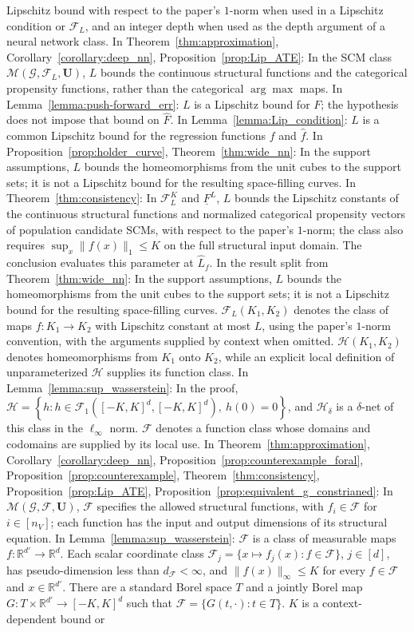 \documentclass[12pt]{article}
\theoremstyle{plain}
\theoremstyle{definition}
\theoremstyle{remark}
\begin{document}
Lipschitz bound with respect to the paper's $1$-norm when used in a Lipschitz condition or $\mathcal{F}_L$, and an integer depth when used as the depth argument of a neural network class. In Theorem~\ref{thm:approximation}, Corollary~\ref{corollary:deep_nn}, Proposition~\ref{prop:Lip_ATE}: In the SCM class $\mathcal{M}(\mathcal{G},\mathcal{F}_L,\boldsymbol{U})$, $L$ bounds the continuous structural functions and the categorical propensity functions, rather than the categorical $\arg\max$ maps. In Lemma~\ref{lemma:push-forward_err}: $L$ is a Lipschitz bound for $F$; the hypothesis does not impose that bound on $\hat{F}$. In Lemma~\ref{lemma:Lip_condition}: $L$ is a common Lipschitz bound for the regression functions $f$ and $\hat{f}$. In Proposition~\ref{prop:holder_curve}, Theorem~\ref{thm:wide_nn}: In the support assumptions, $L$ bounds the homeomorphisms from the unit cubes to the support sets; it is not a Lipschitz bound for the resulting space-filling curves. In Theorem~\ref{thm:consistency}: In $\mathcal F_L^K$ and $\underline F^L$, $L$ bounds the Lipschitz constants of the continuous structural functions and normalized categorical propensity vectors of population candidate SCMs, with respect to the paper's $1$-norm; the class also requires $\sup_x\|f(x)\|_1\leqslant K$ on the full structural input domain. The conclusion evaluates this parameter at $\hat L_f$. In the result split from Theorem~\ref{thm:wide_nn}: In the support assumptions, $L$ bounds the homeomorphisms from the unit cubes to the support sets; it is not a Lipschitz bound for the resulting space-filling curves. $\mathcal{F}_L(K_1,K_2)$ denotes the class of maps $f:K_1\rightarrow K_2$ with Lipschitz constant at most $L$, using the paper's $1$-norm convention, with the arguments supplied by context when omitted. $\mathcal{H}(K_1,K_2)$ denotes homeomorphisms from $K_1$ onto $K_2$, while an explicit local definition of unparameterized $\mathcal{H}$ supplies its function class. In Lemma~\ref{lemma:sup_wasserstein}: In the proof, $\mathcal{H}=\left\{h:h\in\mathcal{F}_1([-K,K]^d,[-K,K]^d),\ h(0)=0\right\}$, and $\mathcal{H}_\delta$ is a $\delta$-net of this class in the $\ell_\infty$ norm. $\mathcal{F}$ denotes a function class whose domains and codomains are supplied by its local use. In Theorem~\ref{thm:approximation}, Corollary~\ref{corollary:deep_nn}, Proposition~\ref{prop:counterexample_foral}, Proposition~\ref{prop:counterexample}, Theorem~\ref{thm:consistency}, Proposition~\ref{prop:Lip_ATE}, Proposition~\ref{prop:equivalent_g_constrianed}: In $\mathcal{M}(\mathcal{G},\mathcal{F},\boldsymbol{U})$, $\mathcal{F}$ specifies the allowed structural functions, with $f_i\in\mathcal{F}$ for $i\in[n_V]$; each function has the input and output dimensions of its structural equation. In Lemma~\ref{lemma:sup_wasserstein}: $\mathcal F$ is a class of measurable maps $f:\mathbb R^{d'}\rightarrow\mathbb R^d$. Each scalar coordinate class $\mathcal F_j=\{x\mapsto f_j(x):f\in\mathcal F\}$, $j\in[d]$, has pseudo-dimension less than $d_{\mathcal F}<\infty$, and $\|f(x)\|_\infty\leqslant K$ for every $f\in\mathcal F$ and $x\in\mathbb R^{d'}$. There are a standard Borel space $T$ and a jointly Borel map $G:T\times\mathbb R^{d'}\rightarrow[-K,K]^d$ such that $\mathcal F=\{G(t,\cdot):t\in T\}$. $K$ is a context-dependent bound or 
\end{document}
